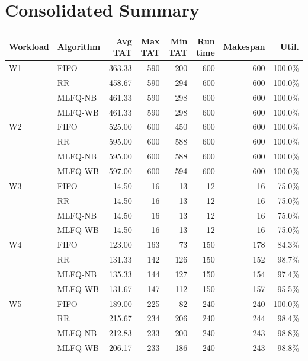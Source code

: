 \documentclass[11pt,a4paper]{article}
\begin{document}
\newpage
\section{Consolidated Summary}

\begin{center}\small
\begin{tabular}{llrrrrrr}
\toprule
\textbf{Workload} & \textbf{Algorithm} & \textbf{Avg TAT} & \textbf{Max TAT} &
\textbf{Min TAT} & \textbf{Run time} & \textbf{Makespan} & \textbf{Util.} \\
\midrule
W1 & FIFO & 363.33 & 590 & 200 & 600 & 600 & 100.0\% \\
 & RR & 458.67 & 590 & 294 & 600 & 600 & 100.0\% \\
 & MLFQ-NB & 461.33 & 590 & 298 & 600 & 600 & 100.0\% \\
 & MLFQ-WB & 461.33 & 590 & 298 & 600 & 600 & 100.0\% \\
\midrule
W2 & FIFO & 525.00 & 600 & 450 & 600 & 600 & 100.0\% \\
 & RR & 595.00 & 600 & 588 & 600 & 600 & 100.0\% \\
 & MLFQ-NB & 595.00 & 600 & 588 & 600 & 600 & 100.0\% \\
 & MLFQ-WB & 597.00 & 600 & 594 & 600 & 600 & 100.0\% \\
\midrule
W3 & FIFO & 14.50 & 16 & 13 & 12 & 16 & 75.0\% \\
 & RR & 14.50 & 16 & 13 & 12 & 16 & 75.0\% \\
 & MLFQ-NB & 14.50 & 16 & 13 & 12 & 16 & 75.0\% \\
 & MLFQ-WB & 14.50 & 16 & 13 & 12 & 16 & 75.0\% \\
\midrule
W4 & FIFO & 123.00 & 163 & 73 & 150 & 178 & 84.3\% \\
 & RR & 131.33 & 142 & 126 & 150 & 152 & 98.7\% \\
 & MLFQ-NB & 135.33 & 144 & 127 & 150 & 154 & 97.4\% \\
 & MLFQ-WB & 131.67 & 147 & 112 & 150 & 157 & 95.5\% \\
\midrule
W5 & FIFO & 189.00 & 225 & 82 & 240 & 240 & 100.0\% \\
 & RR & 215.67 & 234 & 206 & 240 & 244 & 98.4\% \\
 & MLFQ-NB & 212.83 & 233 & 200 & 240 & 243 & 98.8\% \\
 & MLFQ-WB & 206.17 & 233 & 186 & 240 & 243 & 98.8\% \\
\bottomrule\end{tabular}\end{center}
\end{document}
